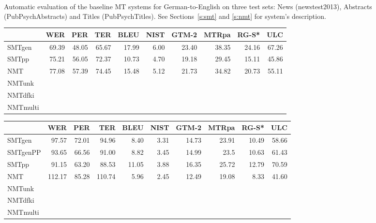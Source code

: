 \documentclass[a4paper,11pt]{article}
\begin{document}
\begin{table}[t]
 \caption{Automatic evaluation of the baseline MT systems for German-to-English on three test sets: News (newstest2013), Abstracts (PubPsychAbstracts) and Titles (PubPsychTitles). See Sections~\ref{s:smt} and \ref{s:nmt} for system's description.}
 \label{tab:DeEn}
\end{table}




\begin{table}[t]
\small

\begin{tabular}{lrrrrrrrrr}
\toprule
         & WER   &  PER  & TER   &  BLEU & NIST & GTM-2 & MTRpa & RG-S* & ULC \\
\midrule
SMTgen	 & 69.39 & 48.05 & 65.67 & 17.99 & 6.00 & 23.40 & 38.35 & 24.16 & 67.26 \\  
SMTpp	 & 75.21 & 56.05 & 72.37 & 10.73 & 4.70 & 19.18 & 29.45 & 15.11 & 45.86 \\  
NMT	 & 77.08 & 57.39 & 74.45 & 15.48 & 5.12 & 21.73 & 34.82 & 20.73 & 55.11 \\  
NMTunk  \\
NMTdfki \\
NMTmulti \\
\bottomrule
\end{tabular}

\begin{tabular}{lrrrrrrrrr}
\toprule
         & WER   &  PER  & TER   &  BLEU & NIST & GTM-2 & MTRpa & RG-S* & ULC \\
\midrule
SMTgen	 &  97.57 & 72.01 &  94.96 & 8.40 & 3.31 & 14.73 & 23.91 & 10.49 & 58.66 \\  
SMTgenPP &  93.65 & 66.56 &  91.00 & 8.82 & 3.45 & 14.99 & 23.5 & 10.63 & 61.43 \\  
SMTpp	 &  91.15 & 63.20 &  88.53 &11.05 & 3.88 & 16.35 & 25.72 & 12.79 & 70.59 \\  
NMT	 & 112.17 & 85.28 & 110.74 & 5.96 & 2.45 & 12.49 & 19.08 & 8.33 & 41.60 \\  
NMTunk  \\
NMTdfki \\
NMTmulti \\
\bottomrule
\end{tabular}



\end{table}
\end{document}
